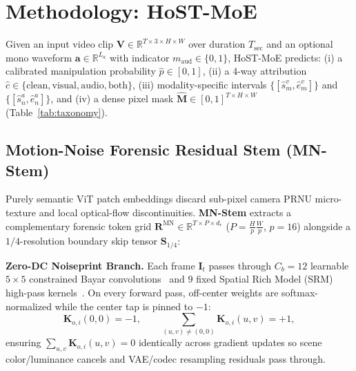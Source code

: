 \documentclass[10pt,twocolumn]{article}
\begin{document}
\section{Methodology: HoST-MoE}
\label{sec:method}

Given an input video clip $\mathbf{V} \in \mathbb{R}^{T \times 3 \times H \times W}$ over duration $T_{\text{sec}}$ and an optional mono waveform $\mathbf{a} \in \mathbb{R}^{L_a}$ with indicator $m_{\text{aud}} \in \{0,1\}$, HoST-MoE predicts: (i) a calibrated manipulation probability $\hat{p} \in [0,1]$, (ii) a 4-way attribution $\hat{c} \in \{\text{clean}, \text{visual}, \text{audio}, \text{both}\}$, (iii) modality-specific intervals $\{[\hat{s}_m^v, \hat{e}_m^v]\}$ and $\{[\hat{s}_n^a, \hat{e}_n^a]\}$, and (iv) a dense pixel mask $\hat{\mathbf{M}} \in [0,1]^{T \times H \times W}$ (Table~\ref{tab:taxonomy}).

\subsection{Motion-Noise Forensic Residual Stem (MN-Stem)}
\label{subsec:mnstem}
Purely semantic ViT patch embeddings discard sub-pixel camera PRNU micro-texture and local optical-flow discontinuities. \textbf{MN-Stem} extracts a complementary forensic token grid $\mathbf{R}^{\text{MN}} \in \mathbb{R}^{T \times P \times d_r}$ ($P = \frac{H}{p}\frac{W}{p}$, $p=16$) alongside a $1/4$-resolution boundary skip tensor $\mathbf{S}_{1/4}$:

\noindent\textbf{Zero-DC Noiseprint Branch.} Each frame $\mathbf{I}_t$ passes through $C_b=12$ learnable $5\times 5$ constrained Bayar convolutions~\cite{bayar2018constrained} and $9$ fixed Spatial Rich Model (SRM) high-pass kernels~\cite{fridrich2012rich}. On every forward pass, off-center weights are softmax-normalized while the center tap is pinned to $-1$:
\begin{equation}
    \mathbf{K}_{o,i}(0,0) = -1, \qquad \sum_{(u,v) \neq (0,0)} \mathbf{K}_{o,i}(u,v) = +1,
    \label{eq:bayar}
\end{equation}
ensuring $\sum_{u,v}\mathbf{K}_{o,i}(u,v)=0$ identically across gradient updates so scene color/luminance cancels and VAE/codec resampling residuals pass through.
\end{document}

